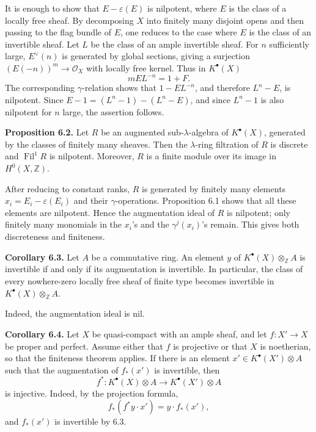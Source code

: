 \documentclass[11pt]{article}
\newcommand{\Fil}{\operatorname{Fil}}
\begin{document}
It is enough to show that \(E-\varepsilon(E)\) is nilpotent, where \(E\) is the class of a locally free sheaf. By decomposing \(X\) into finitely many disjoint opens and then passing to the flag bundle of \(E\), one reduces to the case where \(E\) is the class of an invertible sheaf. Let \(L\) be the class of an ample invertible sheaf. For \(n\) sufficiently large, \(E^\vee(n)\) is generated by global sections, giving a surjection \((E(-n))^m\to \mathcal O_X\) with locally free kernel. Thus in \(K^\bullet(X)\)
\[
  mEL^{-n}=1+F.
\]
The corresponding \(\gamma\)-relation shows that \(1-EL^{-n}\), and therefore \(L^n-E\), is nilpotent. Since \(E-1=(L^n-1)-(L^n-E)\), and since \(L^n-1\) is also nilpotent for \(n\) large, the assertion follows.

\textbf{Proposition 6.2.} Let \(R\) be an augmented sub-\(\lambda\)-algebra of \(K^\bullet(X)\), generated by the classes of finitely many sheaves. Then the \(\lambda\)-ring filtration of \(R\) is discrete and \(\Fil^1R\) is nilpotent. Moreover, \(R\) is a finite module over its image in \(H^0(X,\mathbb Z)\).

After reducing to constant ranks, \(R\) is generated by finitely many elements \(x_i=E_i-\varepsilon(E_i)\) and their \(\gamma\)-operations. Proposition 6.1 shows that all these elements are nilpotent. Hence the augmentation ideal of \(R\) is nilpotent; only finitely many monomials in the \(x_i\)'s and the \(\gamma^j(x_i)\)'s remain. This gives both discreteness and finiteness.

\textbf{Corollary 6.3.} Let \(A\) be a commutative ring. An element \(y\) of \(K^\bullet(X)\otimes_{\mathbb Z}A\) is invertible if and only if its augmentation is invertible. In particular, the class of every nowhere-zero locally free sheaf of finite type becomes invertible in \(K^\bullet(X)\otimes_{\mathbb Z}A\).

Indeed, the augmentation ideal is nil.

\textbf{Corollary 6.4.} Let \(X\) be quasi-compact with an ample sheaf, and let \(f:X'\to X\) be proper and perfect. Assume either that \(f\) is projective or that \(X\) is noetherian, so that the finiteness theorem applies. If there is an element \(x'\in K^\bullet(X')\otimes A\) such that the augmentation of \(f_*(x')\) is invertible, then
\[
  f^*:K^\bullet(X)\otimes A\longrightarrow K^\bullet(X')\otimes A
\]
is injective.
Indeed, by the projection formula,
\[
  f_*(f^*y\cdot x')=y\cdot f_*(x'),
\]
and \(f_*(x')\) is invertible by 6.3.
\end{document}
